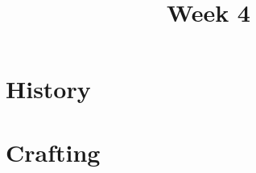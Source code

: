 \documentclass[11pt]{article}
\title{Week 4}
\date{}
\begin{document}
    \maketitle

    \section*{History}
        \begin{itemize}
        \end{itemize}

    \section*{Crafting}
        \begin{itemize}
        \end{itemize}
\end{document}
